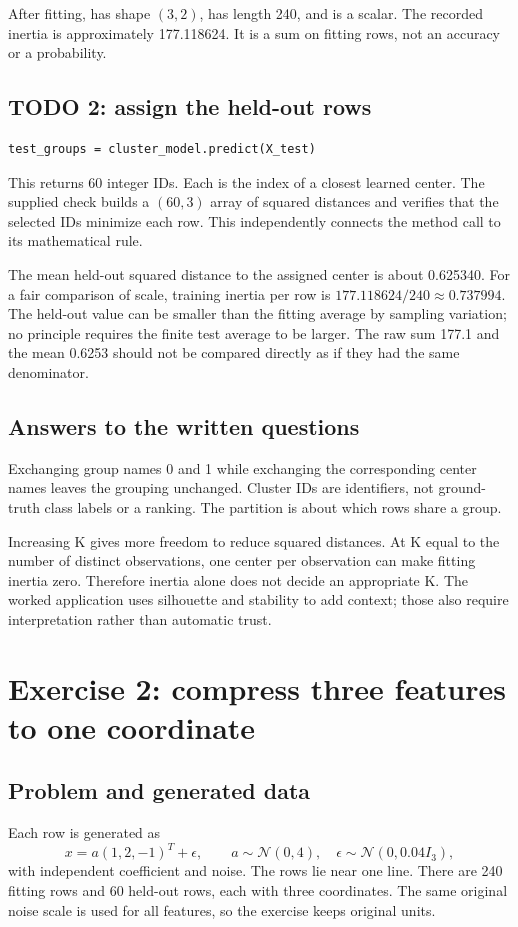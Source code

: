 After fitting,  has shape $(3,2)$,  has length 240, and  is a scalar.
The recorded inertia is approximately 177.118624. It is a sum on fitting rows, not an accuracy or a probability.

\subsection{TODO 2: assign the held-out rows}
\begin{lstlisting}
test_groups = cluster_model.predict(X_test)
\end{lstlisting}
This returns 60 integer IDs. Each is the index of a closest learned center.
The supplied check builds a $(60,3)$ array of squared distances and verifies that the selected IDs minimize each row.
This independently connects the method call to its mathematical rule.

The mean held-out squared distance to the assigned center is about 0.625340.
For a fair comparison of scale, training inertia per row is $177.118624/240\approx0.737994$.
The held-out value can be smaller than the fitting average by sampling variation; no principle requires the finite test average to be larger.
The raw sum 177.1 and the mean 0.6253 should not be compared directly as if they had the same denominator.

\subsection{Answers to the written questions}
Exchanging group names 0 and 1 while exchanging the corresponding center names leaves the grouping unchanged.
Cluster IDs are identifiers, not ground-truth class labels or a ranking. The partition is about which rows share a group.

Increasing K gives more freedom to reduce squared distances. At K equal to the number of distinct observations,
one center per observation can make fitting inertia zero. Therefore inertia alone does not decide an appropriate K.
The worked application uses silhouette and stability to add context; those also require interpretation rather than automatic trust.

\section{Exercise 2: compress three features to one coordinate}
\subsection{Problem and generated data}
Each row is generated as
\[x=a(1,2,-1)^T+\epsilon,\qquad a\sim\mathcal N(0,4),\quad
\epsilon\sim\mathcal N(0,0.04I_3),\]
with independent coefficient and noise. The rows lie near one line.
There are 240 fitting rows and 60 held-out rows, each with three coordinates.
The same original noise scale is used for all features, so the exercise keeps original units.

